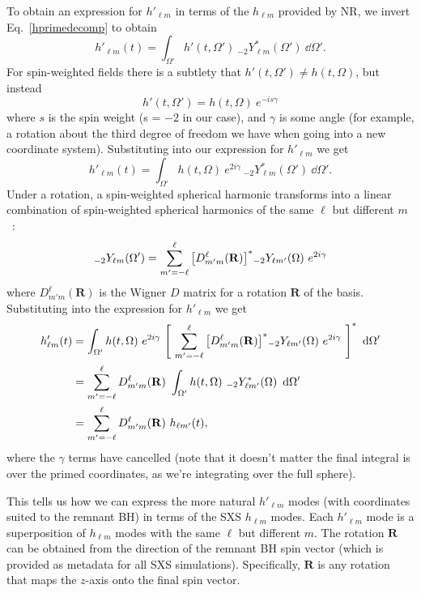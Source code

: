 To obtain an expression for $h'_{\ell m}$ in terms of the $h_{\ell m}$ provided by NR, we invert Eq.~\ref{hprimedecomp} to obtain
\begin{equation}
    h'_{\ell m}(t) = \int_{\Omega'} h'(t,\Omega') ~ {}_{-2}Y_{\ell m}^*(\Omega') ~ \dd{\Omega'}.
\end{equation}
For spin-weighted fields there is a subtlety that $h'(t,\Omega') \neq h(t, \Omega)$, but instead
\begin{equation}
    h'(t,\Omega') = h(t,\Omega) ~ e^{-is\gamma}
\end{equation}
where $s$ is the spin weight (s = $-2$ in our case), and $\gamma$ is some angle (for example, a rotation about the third degree of freedom we have when going into a new coordinate system). 
Substituting into our expression for $h'_{\ell m}$ we get
\begin{equation}
    h'_{\ell m}(t) = \int_{\Omega'} h(t,\Omega) ~ e^{2i\gamma} ~ {}_{-2}Y_{\ell m}^*(\Omega') ~ \dd{\Omega'}.
\end{equation}
Under a rotation, a spin-weighted spherical harmonic transforms into a linear combination of spin-weighted spherical harmonics of the same $\ell$ but different $m$~\cite{Boyle:2013nka}:
\begin{equation}
    {}_{-2}Y_{\ell m}(\Omega') = \sum_{m' = -\ell}^{\ell} \qty[ D^{\ell}_{m' m} (\mathbf{R}) ]^* {}_{-2}Y_{\ell m'}(\Omega) ~ e^{2i\gamma}
\end{equation}
where $D^{\ell}_{m' m} (\mathbf{R})$ is the Wigner $D$ matrix for a rotation $\mathbf{R}$ of the basis. 
Substituting into the expression for $h'_{\ell m}$ we get
\begin{align}\label{Yrotation_wignerD}
    h'_{\ell m}(t) &= \int_{\Omega'} h(t,\Omega) ~ e^{2i\gamma} ~ \qty[ ~ \sum_{m' = -\ell}^{\ell} \qty[ D^{\ell}_{m' m} (\mathbf{R}) ]^* {}_{-2}Y_{\ell m'}(\Omega) ~ e^{2i\gamma} ~ ]^* ~ \dd{\Omega'} \nonumber \\
    &= \sum_{m' = -\ell}^{\ell} D^{\ell}_{m' m} (\mathbf{R}) ~ \int_{\Omega'} h(t,\Omega) ~ {}_{-2}Y^*_{\ell m'}(\Omega) ~ \dd{\Omega'} \nonumber \\
    &= \sum_{m' = -\ell}^{\ell} D^{\ell}_{m' m} (\mathbf{R}) ~ h_{\ell m'}(t),
\end{align}
where the $\gamma$ terms have cancelled (note that it doesn't matter the final integral is over the primed coordinates, as we're integrating over the full sphere).

This tells us how we can express the more natural $h'_{\ell m}$ modes (with coordinates suited to the remnant BH) in terms of the SXS $h_{\ell m}$ modes. Each $h'_{\ell m}$ mode is a superposition of $h_{\ell m}$ modes with the same $\ell$ but different $m$.
The rotation $\mathbf{R}$ can be obtained from the direction of the remnant BH spin vector (which is provided as metadata for all SXS simulations). Specifically, $\mathbf{R}$ is any rotation that maps the $z$-axis onto the final spin vector.

